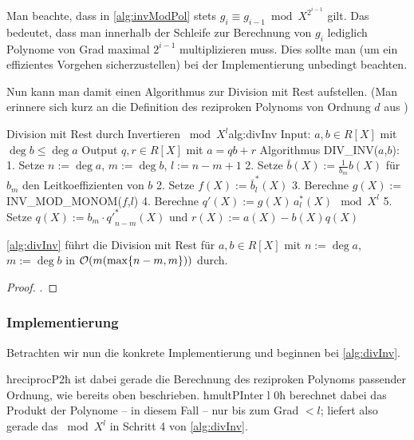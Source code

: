 \begin{bemerkung}
  \label{bem:divPInv}
  Man beachte, dass in \autoref{alg:invModPol} stets $g_i \equiv g_{i-1} \bmod
  X^{2^{i-1}}$ gilt. Das bedeutet, dass man innerhalb der Schleife zur
  Berechnung von $g_i$ lediglich Polynome von Grad maximal $2^{i-1}$
  multiplizieren muss. Dies sollte man (um ein effizientes Vorgehen
  sicherzustellen) bei der Implementierung unbedingt beachten.
\end{bemerkung}

Nun kann man damit einen Algorithmus zur Division mit Rest aufstellen. (Man
erinnere sich kurz an die Definition des reziproken Polynoms von Ordnung $d$
aus )

\begin{pseudocode}{Division mit Rest durch Invertieren $\bmod X^l$}{alg:divInv}
Input: $a,b\in R[X]$ mit $\deg b \leq \deg a$
Output $q,r \in R[X]$ mit $a = qb + r$
Algorithmus DIV_INV($a$,$b$):
  1. Setze $n := \deg a$, $m := \deg b$, $l:= n-m+1$
  2. Setze $\bar b(X) := \tfrac{1}{b_m} b(X)$ für $b_m$ den Leitkoeffizienten von $b$
  2. Setze $f(X) := \bar b^\ast_l(X)$
  3. Berechne $g(X) := $ INV_MOD_MONOM($f$,$l$)
  4. Berechne $q'(X) := g(X)\,a^\ast_l(X)\ \bmod X^l$
  5. Setze $q(X) := b_m \cdot {q'}^\ast_{n-m}(X)$ und $r(X) := a(X) - b(X) q(X)$
\end{pseudocode}

\begin{thm}
  \autoref{alg:divInv} führt die Division mit Rest für $a,b\in R[X]$ mit
  $n := \deg a$, $m := \deg b$ in $\mathcal{O}(m(\max\{n-m,m\}))$ durch.
\end{thm}
\begin{proof}
  \cite[Theorem 3]{divHensel}.
\end{proof}

\subsubsection{Implementierung}

Betrachten wir nun die konkrete Implementierung und beginnen bei 
\autoref{alg:divInv}.


ħreciprocP2ħ ist dabei gerade die Berechnung des reziproken Polynoms passender
Ordnung, wie bereits oben beschrieben. ħmultPInter l 0ħ berechnet dabei das
Produkt der Polynome -- in diesem Fall -- nur bis zum Grad $<l$; liefert also
gerade das $\bmod X^l$ in Schritt 4 von \autoref{alg:divInv}.

